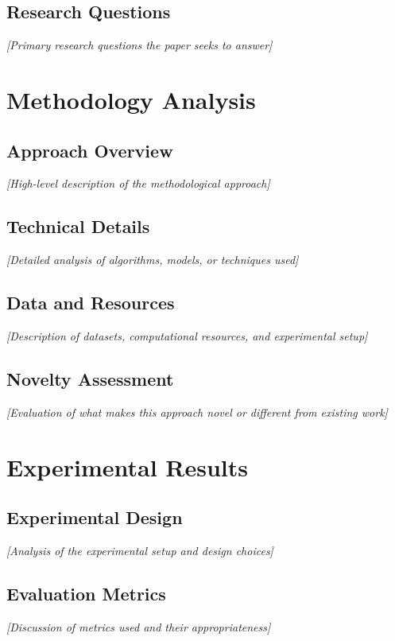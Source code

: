 \documentclass[12pt,a4paper]{article}
\begin{document}
\subsection{Research Questions}
\textit{[Primary research questions the paper seeks to answer]}

\section{Methodology Analysis}

\subsection{Approach Overview}
\textit{[High-level description of the methodological approach]}

\subsection{Technical Details}
\textit{[Detailed analysis of algorithms, models, or techniques used]}

\subsection{Data and Resources}
\textit{[Description of datasets, computational resources, and experimental setup]}

\subsection{Novelty Assessment}
\textit{[Evaluation of what makes this approach novel or different from existing work]}

\section{Experimental Results}

\subsection{Experimental Design}
\textit{[Analysis of the experimental setup and design choices]}

\subsection{Evaluation Metrics}
\textit{[Discussion of metrics used and their appropriateness]}
\end{document}
